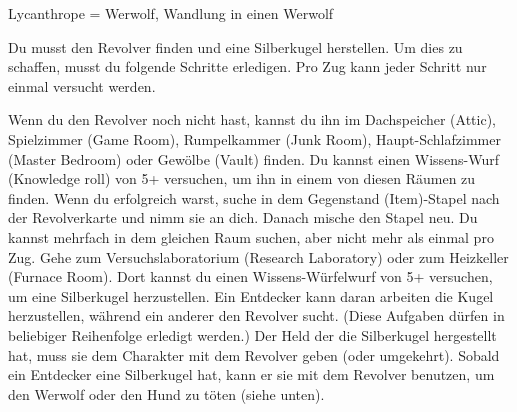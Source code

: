 
Lycanthrope = Werwolf, Wandlung in einen Werwolf





Du musst den Revolver finden und eine Silberkugel herstellen. Um dies zu schaffen, musst du folgende Schritte erledigen. Pro Zug kann jeder Schritt nur einmal versucht werden.
  \begin{itemize}
        \bitem Wenn du den Revolver noch nicht hast, kannst du ihn im Dachspeicher (Attic), Spielzimmer (Game Room), Rumpelkammer (Junk Room), Haupt-Schlafzimmer (Master Bedroom) oder Gewölbe (Vault) finden. Du kannst einen Wissens-Wurf (Knowledge roll) von 5+ versuchen, um ihn in einem von diesen Räumen zu finden. Wenn du erfolgreich warst, suche in dem Gegenstand (Item)-Stapel nach der Revolverkarte und nimm sie an dich. Danach mische den Stapel neu. Du kannst mehrfach in dem gleichen Raum suchen, aber nicht mehr als einmal pro Zug.
        \bitem Gehe zum Versuchslaboratorium (Research Laboratory) oder zum Heizkeller (Furnace Room). Dort kannst du einen Wissens-Würfelwurf von 5+ versuchen, um eine Silberkugel herzustellen. Ein Entdecker kann daran arbeiten die Kugel herzustellen, während ein anderer den Revolver sucht. (Diese Aufgaben dürfen in beliebiger Reihenfolge erledigt werden.)
\newpage
        \bitem Der Held der die Silberkugel hergestellt hat, muss sie dem Charakter mit dem Revolver geben (oder umgekehrt).
        \bitem Sobald ein Entdecker eine Silberkugel hat, kann er sie mit dem Revolver benutzen, um den Werwolf oder den Hund zu töten (siehe unten).
    \end{itemize}

